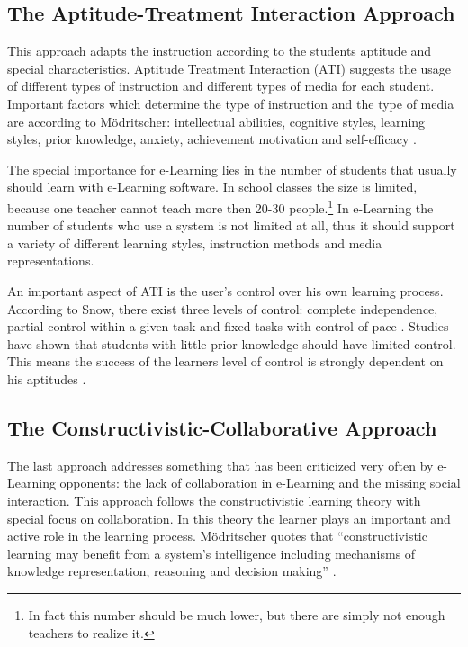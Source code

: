 \subsection{The Aptitude-Treatment Interaction Approach}
This approach adapts the instruction according to the students aptitude and
special characteristics. Aptitude Treatment Interaction (ATI) suggests the
usage of different types of instruction and different types of media for each
student. Important factors which determine the type of instruction and the
type of media are according to M\"{o}dritscher: intellectual abilities,
cognitive styles, learning styles, prior knowledge, anxiety, achievement
motivation and self-efficacy \cite{Modritscher2004}.

The special importance for e-Learning lies in the number of students that
usually should learn with e-Learning software. In school classes the size is
limited, because one teacher cannot teach more then 20-30 people.\footnote{In fact this
number should be much lower, but there are simply not enough teachers to
realize it.} In e-Learning the number of students who use a system is not
limited at all, thus it should support a variety of different learning styles,
instruction methods and media representations.

An important aspect of ATI is the user's control over his own learning
process. According to Snow, there exist three levels of control: complete
independence, partial control within a given task and fixed tasks with control
of pace \cite{Snow1980}. Studies have shown that students with
little prior knowledge should have limited control. This means the success of
the learners level of control is strongly dependent on his aptitudes
\cite{Modritscher2004}.

\subsection{The Constructivistic-Collaborative Approach}
The last approach addresses something that has been criticized very often by
e-Learning opponents: the lack of collaboration in e-Learning and the missing
social interaction. This approach follows the constructivistic learning theory
with special focus on collaboration. In this theory the learner plays an
important and active role in the learning process. M\"{o}dritscher quotes
\cite{Akhras2000} that ``constructivistic learning may benefit from a system's
intelligence including mechanisms of knowledge representation, reasoning and
decision making'' \cite{Modritscher2004}.

